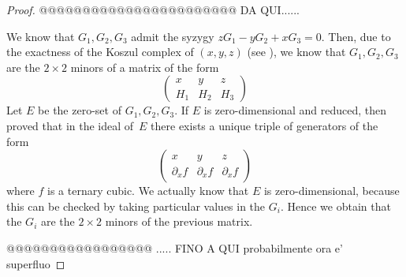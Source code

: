 \documentclass[11pt, a4paper, reqno, captions=tableheading,bibliography=totoc]{scrartcl}
\theoremstyle{plain}
\theoremstyle{definition}
\begin{document}
\begin{proof}
@@@@@@@@@@@@@@@@@@@@@@@ DA QUI...... 

 We know that $G_1, G_2, G_3$ admit the syzygy $z G_1 - y G_2 + x G_3 = 0$.
Then, due to the exactness of the Koszul complex of $(x,y,z)$ 
(see \cite[Chapter~17]{Eisenbud1995}),
we know that $G_1, G_2, G_3$ are the $2 \times 2$ minors of a matrix of the form
%
\[
 \left(
 \begin{array}{ccc}
  x & y & z \\
  H_1 & H_2 & H_3
 \end{array}
 \right)
\]
%
Let $E$ be the zero-set of $G_1, G_2, G_3$.
If $E$ is zero-dimensional and reduced,
then \cite{BGV} proved that in the ideal of~$E$ there exists a unique triple of generators of the form
%
\[
 \left(
 \begin{array}{ccc}
  x & y & z \\
  \partial_x f & \partial_x f & \partial_x f
 \end{array}
 \right)
\]
%
where $f$ is a ternary cubic.
We actually know that $E$ is zero-dimensional, because this can be checked by taking particular values in the $G_i$.
Hence we obtain that the $G_i$ are the $2\times 2$ minors of the previous matrix.

@@@@@@@@@@@@@@@@@ ..... FINO A QUI probabilmente ora e' superfluo


\end{proof}
\end{document}
